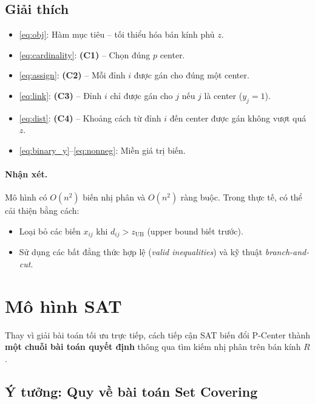 \documentclass[11pt,a4paper]{article}
\begin{document}
\subsection{Giải thích}

\begin{itemize}[nosep]
    \item \eqref{eq:obj}: Hàm mục tiêu -- tối thiểu hóa bán kính phủ $z$.
    \item \eqref{eq:cardinality}: \textbf{(C1)} -- Chọn đúng $p$ center.
    \item \eqref{eq:assign}: \textbf{(C2)} -- Mỗi đỉnh $i$ được gán cho đúng một center.
    \item \eqref{eq:link}: \textbf{(C3)} -- Đỉnh $i$ chỉ được gán cho $j$ nếu $j$ là center ($y_j = 1$).
    \item \eqref{eq:dist}: \textbf{(C4)} -- Khoảng cách từ đỉnh $i$ đến center được gán không vượt quá $z$.
    \item \eqref{eq:binary_y}--\eqref{eq:nonneg}: Miền giá trị biến.
\end{itemize}

\paragraph{Nhận xét.}
Mô hình có $O(n^2)$ biến nhị phân và $O(n^2)$ ràng buộc.
Trong thực tế, có thể cải thiện bằng cách:
\begin{itemize}[nosep]
    \item Loại bỏ các biến $x_{ij}$ khi $d_{ij} > z_{\text{UB}}$ (upper bound biết trước).
    \item Sử dụng các bất đẳng thức hợp lệ (\textit{valid inequalities}) và kỹ thuật \textit{branch-and-cut}.
\end{itemize}


\section{Mô hình SAT}
\label{sec:sat}

Thay vì giải bài toán tối ưu trực tiếp, cách tiếp cận SAT biến đổi P-Center thành \textbf{một chuỗi bài toán quyết định} thông qua tìm kiếm nhị phân trên bán kính $R$.

\subsection{Ý tưởng: Quy về bài toán Set Covering}
\end{document}
